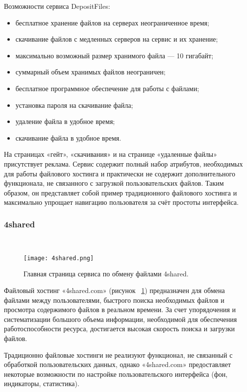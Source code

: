 Возможности сервиса DepositFiles:
\begin{itemize}
  \item бесплатное хранение файлов на серверах неограниченное время;
  \item скачивание файлов с медленных серверов на сервис и их хранение;
  \item максимально возможный размер хранимого файла — 10 гигабайт;
  \item суммарный объем хранимых файлов неограничен;
  \item бесплатное программное обеспечение для работы с файлами;
  \item установка пароля на скачивание файла;
  \item удаление файла в удобное время;
  \item скачивание файла в удобное время. 
\end{itemize}

На страницах «гейт», «скачивания» и на странице «удаленные файлы» присутствует реклама. 
Сервис содержит полный набор атрибутов, необходимых для работы файлового хостинга и практически не содержит дополнительного функционала, не связанного с загрузкой пользовательских файлов. 
Таким образом, он представляет собой пример традиционного файлового хостинга и максимально упрощает навигацию пользователя за счёт простоты интерфейса.

\subsubsection{4shared}~\\
\label{ssub:practice:itechart_characteristic:4shared}

\begin{figure}[ht]
  \centering
  \texttt{[image: 4shared.png]}  
    \caption{ Главная страница сервиса по обмену файлами 4shared. }
    \label{fig:4shared}
\end{figure}

Файловый хостинг «4shared.com» (рисунок ~\ref{fig:4shared}) предназначен для обмена файлами между пользователями, быстрого поиска необходимых файлов и просмотра содержимого файлов в реальном времени. За счет упорядочения и систематизации большого объема информации, необходимой для обеспечения работоспособности ресурса, достигается высокая скорость поиска и загрузки файлов.

Традиционно файловые хостинги не реализуют функционал, не связанный с обработкой пользовательских данных, однако «4shared.com» предоставляет некоторые возможности по настройке пользовательского интерфейса (фон, индикаторы, статистика).


